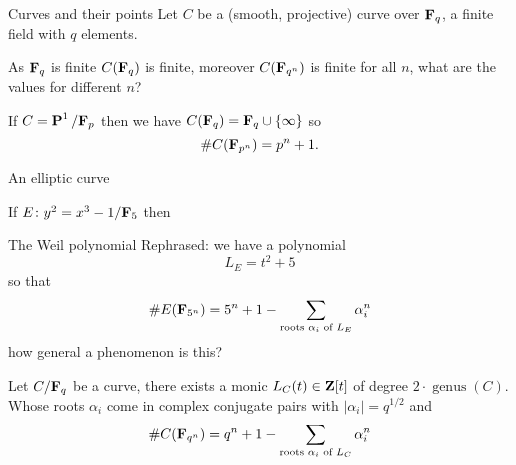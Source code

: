 \begin{frame}{Curves and their points}
    Let $C$ be a (smooth, projective) curve over $\mathbf F_q$, a finite field with $q$ elements.
    \pause

    As $\mathbf F_q$ is finite $C(\mathbf F_q)$ is finite, moreover $C(\mathbf F_{q^n})$ is finite for all $n$, what are the values for different $n$?  \pause
    \begin{example}
        If $C  = \operatorname{\mathbf{P}}^1/\mathbf F_p$ then we have $C (\mathbf F_q) = \mathbf F_q \cup\{\infty\}$ so
        \[\#C(\mathbf F_{p^n}) = p^n + 1\text.\]
    \end{example}
\end{frame}

\begin{frame}{An elliptic curve}
    \begin{example}
        If $E\colon y^2 = x^3 - 1/\mathbf F_5$ then
        \begin{table}
            \centering
        \end{table}


    \end{example}


\end{frame}



\begin{frame}{The Weil polynomial}
    Rephrased: we have a polynomial
    \[L_E = t^2 + 5\]
    so that
    \[\#E(\mathbf F_{5^n}) = 5^n + 1 - \sum_{\text{roots }\alpha_i \text{ of }L_E} \alpha_i^n\]
    how general a phenomenon is this?\pause

    \begin{theorem}
        Let $C / \mathbf F_q$ be a curve, there exists a monic $L_C(t) \in \mathbf{Z}[ t ]$ of degree $2 \cdot \operatorname{genus}(C)$. Whose roots $\alpha_i$ come in complex conjugate pairs with $|\alpha_i| = q^{1/2}$ and
        \[\#C(\mathbf F_{q^n}) = q^n + 1 - \sum_{\text{roots }\alpha_i \text{ of }L_C} \alpha_i^n\]
    \end{theorem}


\end{frame}

